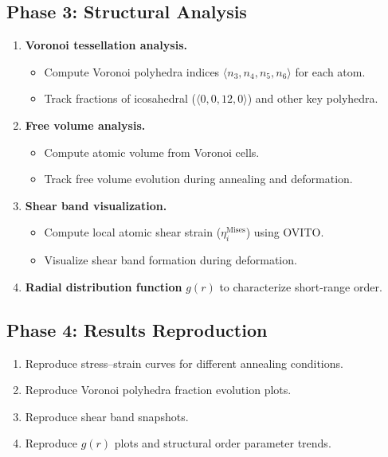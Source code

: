 \documentclass[11pt,a4paper]{article}
\begin{document}
\subsection{Phase 3: Structural Analysis}
\begin{enumerate}[label=\textbf{3.\arabic*}]
  \item \textbf{Voronoi tessellation analysis.}
    \begin{itemize}
      \item Compute Voronoi polyhedra indices $\langle n_3, n_4, n_5, n_6 \rangle$ for each atom.
      \item Track fractions of icosahedral ($\langle 0,0,12,0 \rangle$) and other key polyhedra.
    \end{itemize}
  \item \textbf{Free volume analysis.}
    \begin{itemize}
      \item Compute atomic volume from Voronoi cells.
      \item Track free volume evolution during annealing and deformation.
    \end{itemize}
  \item \textbf{Shear band visualization.}
    \begin{itemize}
      \item Compute local atomic shear strain ($\eta_i^{\text{Mises}}$) using OVITO.
      \item Visualize shear band formation during deformation.
    \end{itemize}
  \item \textbf{Radial distribution function} $g(r)$ to characterize short-range order.
\end{enumerate}

\subsection{Phase 4: Results Reproduction}
\begin{enumerate}[label=\textbf{4.\arabic*}]
  \item Reproduce stress--strain curves for different annealing conditions.
  \item Reproduce Voronoi polyhedra fraction evolution plots.
  \item Reproduce shear band snapshots.
  \item Reproduce $g(r)$ plots and structural order parameter trends.
\end{enumerate}
\end{document}
